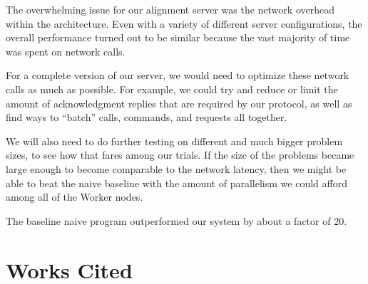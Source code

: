 \documentclass[12pt]{article}
\begin{document}
The overwhelming issue for our alignment server was the network overhead within the architecture. Even with a variety of different server configurations, the overall performance turned out to be similar because the vast majority of time was spent on network calls. 

For a complete version of our server, we would need to optimize these network calls as much as possible. For example, we could try and reduce or limit the amount of acknowledgment replies that are required by our protocol, as well as find ways to ``batch'' calls, commands, and requests all together.

We will also need to do further testing on different and much bigger problem sizes, to see how that fares among our trials. If the size of the problems became large enough to become comparable to the network latency, then we might be able to beat the naive baseline with the amount of parallelism we could afford among all of the Worker nodes.

The baseline naive program outperformed our system by about a factor of 20.


\section{Works Cited}
\end{document}
